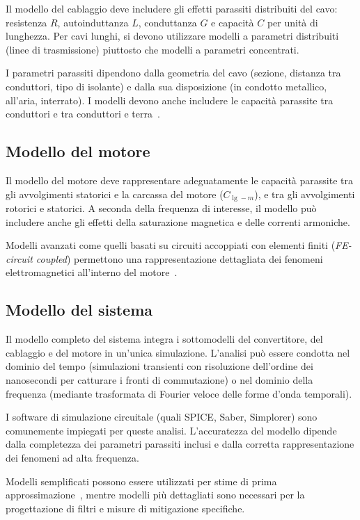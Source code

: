 Il modello del cablaggio deve includere gli effetti parassiti distribuiti del cavo: resistenza $R$, autoinduttanza $L$, conduttanza $G$ e capacità $C$ per unità di lunghezza. Per cavi lunghi, si devono utilizzare modelli a parametri distribuiti (linee di trasmissione) piuttosto che modelli a parametri concentrati.

I parametri parassiti dipendono dalla geometria del cavo (sezione, distanza tra conduttori, tipo di isolante) e dalla sua disposizione (in condotto metallico, all'aria, interrato). I modelli devono anche includere le capacità parassite tra conduttori e tra conduttori e terra~\cite{steenstra2008}.

\subsection{Modello del motore}

Il modello del motore deve rappresentare adeguatamente le capacità parassite tra gli avvolgimenti statorici e la carcassa del motore ($C_{\lg-m}$), e tra gli avvolgimenti rotorici e statorici. A seconda della frequenza di interesse, il modello può includere anche gli effetti della saturazione magnetica e delle correnti armoniche.

Modelli avanzati come quelli basati su circuiti accoppiati con elementi finiti (\textit{FE-circuit coupled}) permettono una rappresentazione dettagliata dei fenomeni elettromagnetici all'interno del motore~\cite{mohammed2010}.

\subsection{Modello del sistema}

Il modello completo del sistema integra i sottomodelli del convertitore, del cablaggio e del motore in un'unica simulazione. L'analisi può essere condotta nel dominio del tempo (simulazioni transienti con risoluzione dell'ordine dei nanosecondi per catturare i fronti di commutazione) o nel dominio della frequenza (mediante trasformata di Fourier veloce delle forme d'onda temporali).

I software di simulazione circuitale (quali SPICE, Saber, Simplorer) sono comunemente impiegati per queste analisi. L'accuratezza del modello dipende dalla completezza dei parametri parassiti inclusi e dalla corretta rappresentazione dei fenomeni ad alta frequenza.

Modelli semplificati possono essere utilizzati per stime di prima approssimazione~\cite{costa2005, moreau2009, gubia2005, jettanasen2009, ran1998}, mentre modelli più dettagliati sono necessari per la progettazione di filtri e misure di mitigazione specifiche.
